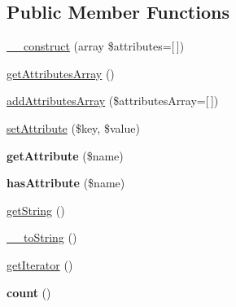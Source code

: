 \subsection*{Public Member Functions}
\begin{DoxyCompactItemize}
\item 
\mbox{\hyperlink{class_pes_1_1_dom_1_1_node_1_1_attributes_1_1_attributes_abstract_afe55bc1439758d475e70446a774807d9}{\+\_\+\+\_\+construct}} (array \$attributes=\mbox{[}$\,$\mbox{]})
\item 
\mbox{\hyperlink{class_pes_1_1_dom_1_1_node_1_1_attributes_1_1_attributes_abstract_a777187fb39c10ae49a97e9bd1878bf0f}{get\+Attributes\+Array}} ()
\item 
\mbox{\hyperlink{class_pes_1_1_dom_1_1_node_1_1_attributes_1_1_attributes_abstract_a80b50df7d001d00c8fc69c4a1aa07f3b}{add\+Attributes\+Array}} (\$attributes\+Array=\mbox{[}$\,$\mbox{]})
\item 
\mbox{\hyperlink{class_pes_1_1_dom_1_1_node_1_1_attributes_1_1_attributes_abstract_a0510466da552b21cc2be4e4c4119a5bb}{set\+Attribute}} (\$key, \$value)
\item 
\mbox{\label{class_pes_1_1_dom_1_1_node_1_1_attributes_1_1_attributes_abstract_ae954da422d40fc286691e54679e44c6f}} 
{\bfseries get\+Attribute} (\$name)
\item 
\mbox{\label{class_pes_1_1_dom_1_1_node_1_1_attributes_1_1_attributes_abstract_ac78ba27a41d0291c61326022489d4986}} 
{\bfseries has\+Attribute} (\$name)
\item 
\mbox{\hyperlink{class_pes_1_1_dom_1_1_node_1_1_attributes_1_1_attributes_abstract_afde980915cc78c408e6ac75b662e631c}{get\+String}} ()
\item 
\mbox{\hyperlink{class_pes_1_1_dom_1_1_node_1_1_attributes_1_1_attributes_abstract_a7516ca30af0db3cdbf9a7739b48ce91d}{\+\_\+\+\_\+to\+String}} ()
\item 
\mbox{\hyperlink{class_pes_1_1_dom_1_1_node_1_1_attributes_1_1_attributes_abstract_a7a9f937c2958e6f4dd7b030f86fb70b7}{get\+Iterator}} ()
\item 
\mbox{\label{class_pes_1_1_dom_1_1_node_1_1_attributes_1_1_attributes_abstract_ac751e87b3d4c4bf2feb03bee8b092755}} 
{\bfseries count} ()
\end{DoxyCompactItemize}


